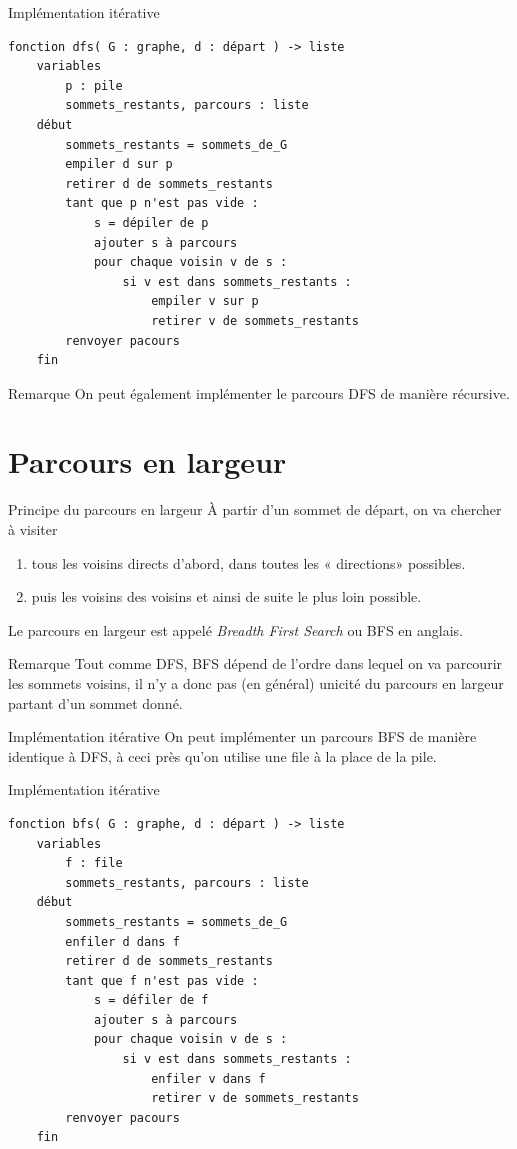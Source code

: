 \documentclass[10pt]{beamer}
\begin{document}
\begin{frame}[fragile]{Implémentation itérative}
\small
\begin{verbatim}
fonction dfs( G : graphe, d : départ ) -> liste
    variables
        p : pile
        sommets_restants, parcours : liste
    début
        sommets_restants = sommets_de_G
        empiler d sur p
        retirer d de sommets_restants
        tant que p n'est pas vide :
            s = dépiler de p
            ajouter s à parcours
            pour chaque voisin v de s :
                si v est dans sommets_restants :
                    empiler v sur p
                    retirer v de sommets_restants
        renvoyer pacours
    fin
\end{verbatim}
\normalsize
\end{frame}


\begin{frame}{Remarque}
On peut également implémenter le parcours DFS de manière récursive.
\end{frame}
\section*{Parcours en largeur}
\begin{frame}{Principe du parcours en largeur}
À partir d'un sommet de départ, on va chercher à visiter
\begin{enumerate}
	\item tous les voisins directs d'abord, dans toutes les « directions» possibles.
    \item puis les voisins des voisins et ainsi de suite le plus loin possible.
\end{enumerate}
Le parcours en largeur est appelé \textit{Breadth First Search} ou BFS en anglais.
\end{frame}
\begin{frame}{Remarque}
Tout comme DFS, BFS dépend de l'ordre dans lequel on va parcourir les sommets voisins, il n'y a donc pas (en général) unicité du parcours en largeur partant d'un sommet donné.
\end{frame}

\begin{frame}{Implémentation itérative}
On peut implémenter un parcours BFS de manière identique à DFS, à ceci près qu'on utilise une \alert{file} à la place de la pile.
\end{frame}

\begin{frame}[fragile]{Implémentation itérative}
    \small
\begin{verbatim}
fonction bfs( G : graphe, d : départ ) -> liste
    variables
        f : file
        sommets_restants, parcours : liste
    début
        sommets_restants = sommets_de_G
        enfiler d dans f
        retirer d de sommets_restants
        tant que f n'est pas vide :
            s = défiler de f
            ajouter s à parcours
            pour chaque voisin v de s :
                si v est dans sommets_restants :
                    enfiler v dans f
                    retirer v de sommets_restants
        renvoyer pacours
    fin
\end{verbatim}
\normalsize
\end{frame}
\end{document}
